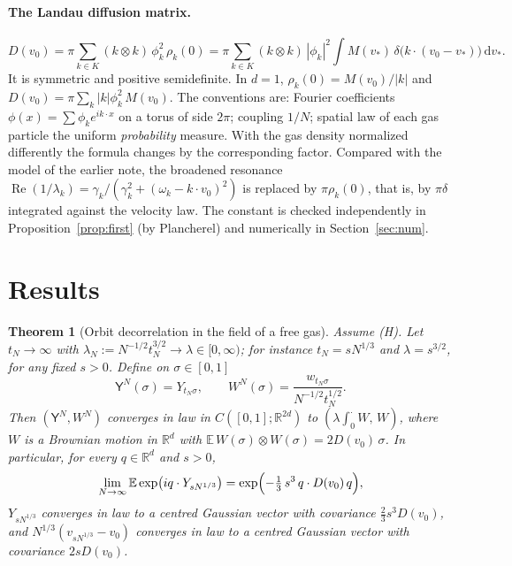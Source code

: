 \documentclass[11pt]{article}
\newcommand{\dd}{\mathrm{d}}
\newcommand{\E}{\mathbb{E}}
\newcommand{\R}{\mathbb{R}}
\renewcommand{\Re}{\operatorname{Re}}
\newcommand{\sY}{\mathsf{Y}}
\newtheorem{theorem}{Theorem}
\theoremstyle{remark}
\begin{document}
\paragraph{The Landau diffusion matrix.}
\begin{equation}
  D(v_0)=\pi\sum_{k\in K}(k\otimes k)\,\phi_k^2\,\rho_k(0)
  =\pi\sum_{k\in K}(k\otimes k)\,|\phi_k|^2\int M(v_*)\,
   \delta\bigl(k\cdot(v_0-v_*)\bigr)\,\dd v_* .
  \label{eq:D}
\end{equation}
It is symmetric and positive semidefinite. In $d=1$,
$\rho_k(0)=M(v_0)/|k|$ and $D(v_0)=\pi\sum_k|k|\phi_k^2\,M(v_0)$. The
conventions are: Fourier coefficients $\phi(x)=\sum\phi_ke^{ik\cdot x}$ on a
torus of side $2\pi$; coupling $1/N$; spatial law of each gas particle the
uniform \emph{probability} measure. With the gas density normalized
differently the formula changes by the corresponding factor. Compared with
the model of the earlier note, the broadened resonance
$\Re(1/\lambda_k)=\gamma_k/(\gamma_k^2+(\omega_k-k\cdot v_0)^2)$ is replaced
by $\pi\rho_k(0)$, that is, by $\pi\delta$ integrated against the velocity
law. The constant is checked independently in Proposition~\ref{prop:first}
(by Plancherel) and numerically in Section~\ref{sec:num}.

\section{Results}

\begin{theorem}[Orbit decorrelation in the field of a free gas]
\label{thm:main}
Assume \textup{(H)}. Let $t_N\to\infty$ with
$\lambda_N:=N^{-1/2}t_N^{3/2}\to\lambda\in[0,\infty)$; for instance
$t_N=sN^{1/3}$ and $\lambda=s^{3/2}$, for any fixed $s>0$. Define on
$\sigma\in[0,1]$
\[
  \sY^N(\sigma)=Y_{t_N\sigma},\qquad
  W^N(\sigma)=\frac{w_{t_N\sigma}}{N^{-1/2}t_N^{1/2}} .
\]
Then $(\sY^N,W^N)$ converges in law in $C([0,1];\R^{2d})$ to
$(\lambda\int_0^\cdot W,\,W)$, where $W$ is a Brownian motion in $\R^d$ with
$\E\,W(\sigma)\otimes W(\sigma)=2D(v_0)\,\sigma$. In particular, for every
$q\in\R^d$ and $s>0$,
\begin{equation}
  \lim_{N\to\infty}\E\exp\bigl(iq\cdot Y_{sN^{1/3}}\bigr)
  =\exp\Bigl(-\tfrac13\,s^3\,q\cdot D(v_0)\,q\Bigr),
  \label{eq:cf}
\end{equation}
$Y_{sN^{1/3}}$ converges in law to a centred Gaussian vector with covariance
$\tfrac23s^3D(v_0)$, and $N^{1/3}(v_{sN^{1/3}}-v_0)$ converges in law to a
centred Gaussian vector with covariance $2sD(v_0)$.
\end{theorem}
\end{document}
